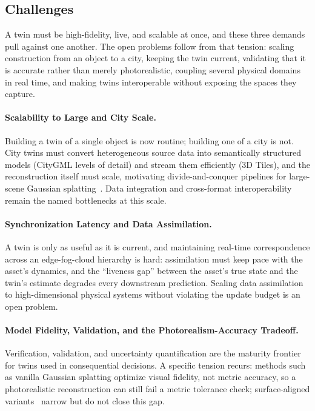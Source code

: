 \subsection{Challenges}
\label{subsec:p4-sec11-1-challenges}

A twin must be high-fidelity, live, and scalable at once, and these three demands pull against one another. The open problems follow from that tension: scaling construction from an object to a city, keeping the twin current, validating that it is accurate rather than merely photorealistic, coupling several physical domains in real time, and making twins interoperable without exposing the spaces they capture.

\paragraph{Scalability to Large and City Scale.} Building a twin of a single object is now routine; building one of a city is not.
City twins must convert heterogeneous source data into semantically structured models (CityGML levels of detail) and stream them efficiently (3D Tiles), and the reconstruction itself must scale, motivating divide-and-conquer pipelines for large-scene Gaussian splatting~\cite{liu2025citygaussian}.
Data integration and cross-format interoperability remain the named bottlenecks at this scale.

\paragraph{Synchronization Latency and Data Assimilation.} A twin is only as useful as it is current, and maintaining real-time correspondence across an edge-fog-cloud hierarchy is hard: assimilation must keep pace with the asset's dynamics, and the ``liveness gap'' between the asset's true state and the twin's estimate degrades every downstream prediction. Scaling data assimilation to high-dimensional physical systems without violating the update budget is an open problem.

\paragraph{Model Fidelity, Validation, and the Photorealism-Accuracy Tradeoff.} Verification, validation, and uncertainty quantification are the maturity frontier for twins used in consequential decisions.
A specific tension recurs: methods such as vanilla Gaussian splatting optimize visual fidelity, not metric accuracy, so a photorealistic reconstruction can still fail a metric tolerance check; surface-aligned variants~\cite{guedon2024sugar,huang20242d} narrow but do not close this gap.

